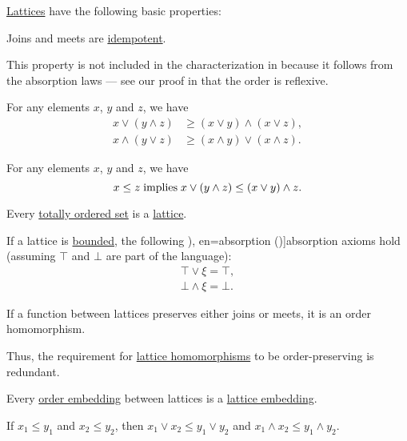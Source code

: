 \begin{proposition}\label{thm:def:lattice}
  \hyperref[def:lattice]{Lattices} have the following basic properties:
  \begin{thmenum}
     Joins and meets are \hyperref[def:binary_operation/idempotent]{idempotent}.

    This property is not included in the characterization in  because it follows from the absorption laws --- see our proof in  that the order is reflexive.

     For any elements \( x \), \( y \) and \( z \), we have
    \begin{align}
      x \vee (y \wedge z) &\geq (x \vee y) \wedge (x \vee z), \label{eq:thm:def:lattice/distributivity_inequality/join_over_meet} \\
      x \wedge (y \vee z) &\geq (x \wedge y) \vee (x \wedge z). \label{eq:thm:def:lattice/distributivity_inequality/meet_over_join}
    \end{align}

     For any elements \( x \), \( y \) and \( z \), we have
    \begin{equation}\label{eq:thm:def:lattice/modularity_inequality}
      x \leq z \T{implies} x \vee (y \wedge z) \leq (x \vee y) \wedge z.
    \end{equation}

     Every \hyperref[def:totally_ordered_set]{totally ordered set} is a \hyperref[def:lattice]{lattice}.

     If a lattice is \hyperref[def:extremal_points/bounds]{bounded}, the following \term[ru=поглощение (\cite[6]{Гуров2013}), en=absorption (\cite[8]{Birkhoff1967})]{absorption} axioms hold (assuming \( \top \) and \( \bot \) are part of the language):
    \begin{align}
      \top \vee \xi = \top \label{eq:thm:def:lattice/bounded_absorption/join}, \\
      \bot \wedge \xi = \bot \label{eq:thm:def:lattice/bounded_absorption/meet}.
    \end{align}

     If a function between lattices preserves either joins or meets, it is an order homomorphism.

    Thus, the requirement for \hyperref[def:lattice/homomorphism]{lattice homomorphisms} to be order-preserving is redundant.

     Every \hyperref[def:preordered_set/homomorphism]{order embedding} between lattices is a \hyperref[def:lattice/homomorphism]{lattice embedding}.

     If \( x_1 \leq y_1 \) and \( x_2 \leq y_2 \), then \( x_1 \vee x_2 \leq y_1 \vee y_2 \) and \( x_1 \wedge x_2 \leq y_1 \wedge y_2 \).
  \end{thmenum}
\end{proposition}
